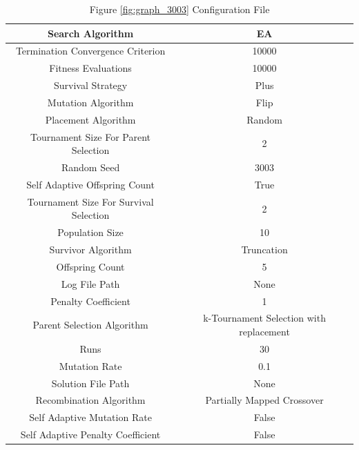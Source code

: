 \documentclass{standalone}
\begin{document}
\begin{table}[!htb]
	\centering
	\caption{Figure \ref{fig:graph_3003} Configuration File}
	\label{tab:graph_3003}
	\begin{tabular}{| c | c |}
		\hline
		Search Algorithm		& EA		 \\
		\hline
		Termination Convergence Criterion		& 10000		 \\
		\hline
		Fitness Evaluations		& 10000		 \\
		\hline
		Survival Strategy		& Plus		 \\
		\hline
		Mutation Algorithm		& Flip		 \\
		\hline
		Placement Algorithm		& Random		 \\
		\hline
		Tournament Size For Parent Selection		& 2		 \\
		\hline
		Random Seed		& 3003		 \\
		\hline
		Self Adaptive Offspring Count		& True		 \\
		\hline
		Tournament Size For Survival Selection		& 2		 \\
		\hline
		Population Size		& 10		 \\
		\hline
		Survivor Algorithm		& Truncation		 \\
		\hline
		Offspring Count		& 5		 \\
		\hline
		Log File Path		& None		 \\
		\hline
		Penalty Coefficient		& 1		 \\
		\hline
		Parent Selection Algorithm		& k-Tournament Selection with replacement		 \\
		\hline
		Runs		& 30		 \\
		\hline
		Mutation Rate		& 0.1		 \\
		\hline
		Solution File Path		& None		 \\
		\hline
		Recombination Algorithm		& Partially Mapped Crossover		 \\
		\hline
		Self Adaptive Mutation Rate		& False		 \\
		\hline
		Self Adaptive Penalty Coefficient		& False		 \\
		\hline
	\end{tabular}
\end{table}
\end{document}
